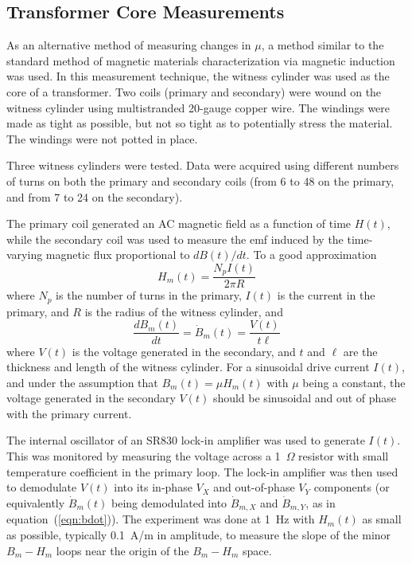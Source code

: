 
\subsection{Transformer Core Measurements}
\label{sec:transformer}

As an alternative method of measuring changes in $\mu$, a method
similar to the standard method of magnetic materials characterization
via magnetic induction was used.  In this measurement technique, the
witness cylinder was used as the core of a transformer.  Two coils
(primary and secondary) were wound on the witness cylinder using
multistranded 20-gauge copper wire.  The windings were made as tight
as possible, but not so tight as to potentially stress the material.
The windings were not potted in place.

Three witness cylinders were tested.  Data were acquired
using different numbers of turns on both the primary and secondary
coils (from 6 to 48 on the primary, and from 7 to 24 on the
secondary).



The primary coil generated an AC magnetic field as a function of time
$H(t)$, while the secondary coil was used to measure the emf induced
by the time-varying magnetic flux proportional to $dB(t)/dt$.  To a
good approximation
\begin{equation}
H_m(t)=\frac{N_pI(t)}{2\pi R}
\end{equation}
where $N_p$ is the number of turns in the primary, $I(t)$ is the
current in the primary, and $R$ is the radius of the witness cylinder,
and
\begin{equation}
\frac{dB_m(t)}{dt}=\dot{B}_m(t)=\frac{V(t)}{t\ell}
\label{eqn:bdot}
\end{equation}
where $V(t)$ is the voltage generated in the secondary, and $t$ and
$\ell$ are the thickness and length of the witness cylinder.  For a
sinusoidal drive current $I(t)$, and under the assumption that
$B_m(t)=\mu H_m(t)$ with $\mu$ being a constant, the voltage generated
in the secondary $V(t)$ should be sinusoidal and out of phase with the
primary current.

The internal oscillator of an SR830 lock-in amplifier was used to
generate $I(t)$.  This was monitored by measuring the voltage across a
1~$\Omega$ resistor with small temperature coefficient in the primary
loop.  The lock-in amplifier was then used to demodulate $V(t)$ into
its in-phase $V_X$ and out-of-phase $V_Y$ components (or equivalently
$\dot{B}_m(t)$ being demodulated into $\dot{B}_{m,X}$ and
$\dot{B}_{m,Y}$, as in equation~(\ref{eqn:bdot})).  The experiment was
done at 1~Hz with $H_m(t)$ as small as possible, typically 0.1~A/m in
amplitude, to measure the slope of the minor $B_m-H_m$ loops near the
origin of the $B_m-H_m$ space.


